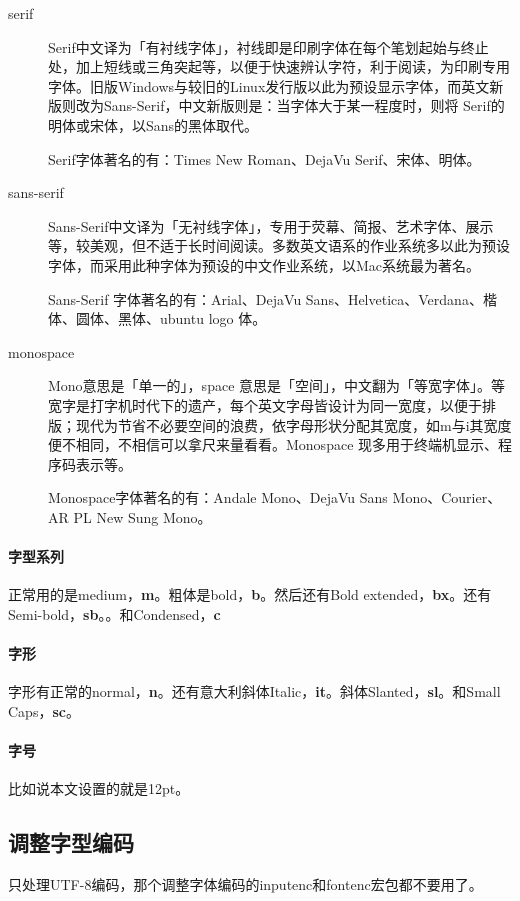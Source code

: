\begin{description}
\item[serif] Serif中文译为「有衬线字体」，衬线即是印刷字体在每个笔划起始与终止处，加上短线或三角突起等，以便于快速辨认字符，利于阅读，为印刷专用字体。旧版Windows与较旧的Linux发行版以此为预设显示字体，而英文新版则改为Sans-Serif，中文新版则是：当字体大于某一程度时，则将 Serif的明体或宋体，以Sans的黑体取代。

Serif字体著名的有：Times New Roman、DejaVu Serif、宋体、明体。

\item[sans-serif] Sans-Serif中文译为「无衬线字体」，专用于荧幕、简报、艺术字体、展示等，较美观，但不适于长时间阅读。多数英文语系的作业系统多以此为预设字体，而采用此种字体为预设的中文作业系统，以Mac系统最为著名。

Sans-Serif 字体著名的有：Arial、DejaVu Sans、Helvetica、Verdana、楷体、圆体、黑体、ubuntu logo 体。

\item[monospace] Mono意思是「单一的」，space 意思是「空间」，中文翻为「等宽字体」。等宽字是打字机时代下的遗产，每个英文字母皆设计为同一宽度，以便于排版；现代为节省不必要空间的浪费，依字母形状分配其宽度，如m与i其宽度便不相同，不相信可以拿尺来量看看。Monospace 现多用于终端机显示、程序码表示等。

Monospace字体著名的有：Andale Mono、DejaVu Sans Mono、Courier、AR PL New Sung Mono。
\end{description}


\paragraph{字型系列}
正常用的是medium，\textbf{m}。粗体是bold，\textbf{b}。然后还有Bold extended，\textbf{bx}。还有Semi-bold，\textbf{sb}。。和Condensed，\textbf{c}


\paragraph{字形}
字形有正常的normal，\textbf{n}。还有意大利斜体Italic，\textbf{it}。斜体Slanted，\textbf{sl}。和Small Caps，\textbf{sc}。


\paragraph{字号}
比如说本文设置的就是12pt。


\subsection{调整字型编码}
\XeLaTeX 只处理UTF-8编码，那个调整字体编码的inputenc和fontenc宏包都不要用了。



